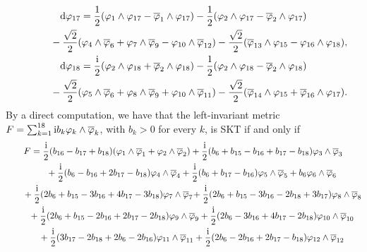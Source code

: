 \documentclass[10pt,a4paper]{amsart}
\numberwithin{equation}{section}
\begin{document}
\begin{Example}
\begin{gather*}
{\rm d} \varphi_{17} = \frac{1}{2} (\varphi_1 \wedge \varphi_{17} - \overline \varphi_1 \wedge \varphi_{17}) - \frac{1}{2} (\varphi_2 \wedge \varphi_{17} - \overline \varphi_2 \wedge \varphi_{17}) \\
\hphantom{{\rm d} \varphi_{18} =}{}- \frac{\sqrt{2}}{2} (\varphi_4 \wedge \overline \varphi_6 + \varphi_7 \wedge \overline \varphi_{9} - \varphi_{10} \wedge \overline \varphi_{12} ) - \frac{\sqrt{2}}{2} ( \overline \varphi_{13} \wedge \varphi_{15} - \varphi_{16} \wedge \varphi_{18}),\\
{\rm d} \varphi_{18} = \frac{{\rm i}}{2} (\varphi_2 \wedge \varphi_{18} + \overline \varphi_2 \wedge \varphi_{18}) - \frac{1}{2} (\varphi_2 \wedge \varphi_{18} - \overline \varphi_2 \wedge \varphi_{18}) \\
\hphantom{{\rm d} \varphi_{18} =}{}
- \frac{\sqrt{2}}{2} (\varphi_5 \wedge \overline \varphi_6 + \varphi_8 \wedge \overline \varphi_{9} +\varphi_{10} \wedge \overline \varphi_{11} )
 - \frac{\sqrt{2}}{2} ( \overline \varphi_{14} \wedge \varphi_{15} + \overline \varphi_{16} \wedge \varphi_{17}).
\end{gather*}
By a direct computation, we have that the left-invariant metric $F = \sum_{k =1}^{18} {\rm i}b_k \varphi_k \wedge \overline \varphi_k$, with $b_k > 0$ for every $k$, is SKT if and only if
\begin{gather*}
F = \frac{{\rm i}}{2} (b_{16} - b_{17} + b_{18}) (\varphi_1 \wedge \overline \varphi_1 + \varphi_2 \wedge \overline \varphi_2) + \frac{{\rm i}}{2} (b_6 +b_{15} - b_{16} + b_{17} - b_{18}) \varphi_3 \wedge \overline \varphi_3\\
\hphantom{F = }{} + \frac{{\rm i}}{2} (b_6 - b_{16} + 2 b_{17} - b_{18}) \varphi_4 \wedge \overline \varphi_4 + \frac{{\rm i}}{2} (b_6 + b_{17} - b_{16}) \varphi_5 \wedge \overline \varphi_5 + b_6 \varphi_6 \wedge \overline \varphi_6\\
\hphantom{F = }{} + \frac{{\rm i}}{2} (2 b_6 + b_{15} - 3 b_{16} + 4 b_{17} - 3 b_{18}) \varphi_7 \wedge \overline \varphi_7\!+ \frac{{\rm i}}{2} (2 b_6 + b_{15} -3 b_{16} - 2 b_{18} + 3 b_{17}) \varphi_8 \wedge \overline \varphi_8\!\\
\hphantom{F = }{} + \frac{{\rm i}}{2} ( 2 b_6 + b_{15} - 2 b_{16} + 2 b_{17} - 2 b_{18}) \varphi_9 \wedge \overline \varphi_9 + \frac{{\rm i}}{2} (2 b_6 - 3 b_{16} + 4 b_{17} - 2 b_{18}) \varphi_{10} \wedge \overline \varphi_{10}\\
\hphantom{F = }{} + \frac{{\rm i}}{2} (3 b_{17} - 2 b_{18} + 2 b_6 - 2 b_{16}) \varphi_{11} \wedge \overline \varphi_{11} + \frac{{\rm i}}{2} (2 b_6 - 2 b_{16} + 2 b_{17} - b_{18}) \varphi_{12} \wedge \overline \varphi_{12}\\

\end{gather*}
\end{Example}
\end{document}
